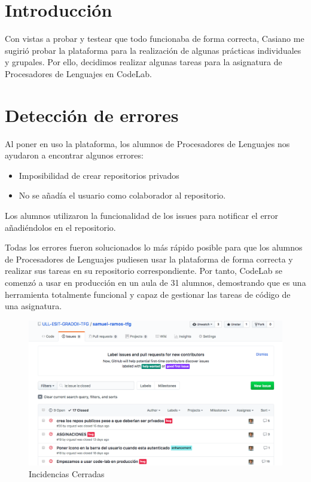 
\section{Introducción}
\label{4:sec1}

Con vistas a probar y testear que todo funcionaba de forma correcta, Casiano me sugirió probar la plataforma para la realización de algunas prácticas individuales y grupales.
Por ello, decidimos realizar algunas tareas para la asignatura de Procesadores de Lenguajes en CodeLab.

\section{Detección de errores}
\label{4:sec2}

Al poner en uso la plataforma, los alumnos de Procesadores de Lenguajes nos ayudaron a encontrar algunos errores:

\begin{itemize}
    \item Imposibilidad de crear repositorios privados
    \item No se añadía el usuario como colaborador al repositorio.
\end{itemize}

Los alumnos utilizaron la funcionalidad de los issues para notificar el error añadiéndolos en el repositorio.

Todas los errores fueron solucionados lo más rápido posible para que los alumnos de Procesadores de Lenguajes pudiesen usar la plataforma de forma correcta y realizar sus tareas en su repositorio correspondiente.
Por tanto, CodeLab se comenzó a usar en producción en un aula de 31 alumnos, demostrando que es una herramienta totalmente funcional y capaz de gestionar las tareas de código de una asignatura.

\begin{figure}[!th]
\begin{center}
\includegraphics[scale=0.5]{images/issues}
\caption{Incidencias Cerradas }
\label{fig:issues}
\end{center}
\end{figure}

